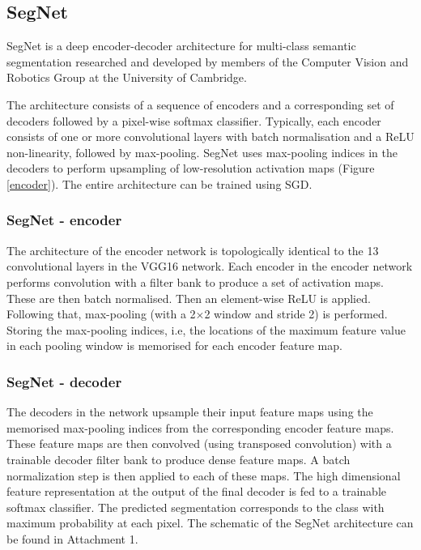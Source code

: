 \newpage
\subsection{SegNet}

SegNet is a deep encoder-decoder architecture for multi-class semantic segmentation researched and developed by members of the Computer Vision and Robotics Group at the University of Cambridge. \cite{segnet_tut}

The architecture consists of a sequence of encoders and a corresponding set of decoders followed by a pixel-wise softmax classifier. Typically, each encoder consists of one or more convolutional layers with batch normalisation and a ReLU non-linearity, followed by max-pooling. SegNet uses max-pooling indices in the decoders to perform upsampling of low-resolution activation maps (Figure \ref{encoder}). The entire architecture can be trained using SGD. \cite{segnet_tut}

\subsubsection{SegNet - encoder}

The architecture of the encoder network is topologically identical to the 13 convolutional layers in the VGG16 network. Each encoder in the encoder network performs convolution with a filter bank to produce a set of activation maps. These are then batch normalised. Then an element-wise ReLU is applied. Following that, max-pooling (with a 2×2 window and stride 2) is performed. Storing the max-pooling indices, i.e, the locations of the maximum feature value in each pooling window is memorised for each encoder feature map. \cite{segnet}

\subsubsection{SegNet - decoder}

The decoders in the network upsample their input feature maps using the memorised max-pooling indices from the corresponding encoder feature maps. These feature maps are then convolved (using transposed convolution) with a trainable decoder filter bank to produce dense feature maps. A batch normalization step is then applied to each of these maps. The high dimensional feature representation at the output of the final decoder is fed to a trainable softmax classifier. The predicted segmentation corresponds to the class with maximum probability at each pixel. \cite{segnet} The schematic of the SegNet architecture can be found in Attachment 1.

